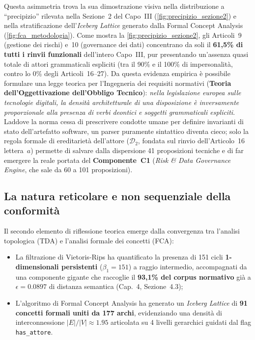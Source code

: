 \documentclass[12pt,a4paper,oneside]{report}
\begin{document}
Questa asimmetria trova la sua dimostrazione visiva nella distribuzione a ``precipizio'' rilevata nella Sezione~2 del Capo~III (\cref{fig:precipizio_sezione2}) e nella stratificazione dell'\emph{Iceberg Lattice} generato dalla Formal Concept Analysis (\cref{fig:fca_metodologia}).
Come mostra la \cref{fig:precipizio_sezione2}, gli Articoli~9 (gestione dei rischi) e~10 (governance dei dati) concentrano da soli il \textbf{61,5\% di tutti i rinvii funzionali} dell'intero Capo~III, pur presentando un'assenza quasi totale di attori grammaticali espliciti (tra il 90\% e il 100\% di impersonalità, contro lo 0\% degli Articoli~16--27). Da questa evidenza empirica è possibile formulare una legge teorica per l'Ingegneria dei requisiti normativi (\textbf{Teoria dell'Oggettivazione dell'Obbligo Tecnico}): \emph{nella legislazione europea sulle tecnologie digitali, la densità architetturale di una disposizione è inversamente proporzionale alla presenza di verbi deontici e soggetti grammaticali espliciti}. Laddove la norma cessa di prescrivere condotte umane per definire invarianti di stato dell'artefatto software, un parser puramente sintattico diventa cieco; solo la regola formale di ereditarietà dell'attore ($\mathcal{D}_2$, fondata sul rinvio dell'Articolo~16 lettera~$a$) permette di salvare dalla dispersione 41 proposizioni tecniche e di far emergere la reale portata del \textbf{Componente~C1} (\emph{Risk \& Data Governance Engine}, che sale da 60 a 101 proposizioni).


\subsection{La natura reticolare e non sequenziale della conformità}

Il secondo elemento di riflessione teorica emerge dalla convergenza tra l'analisi topologica (TDA) e l'analisi formale dei concetti (FCA):
\begin{itemize}
    \item La filtrazione di Vietoris-Rips ha quantificato la presenza di 151 cicli \textbf{1-dimensionali persistenti} ($\beta_1 = 151$) a raggio intermedio, accompagnati da una componente gigante che raccoglie il \textbf{93,1\% del corpus normativo} già a $\epsilon = \num{0,0897}$ di distanza semantica (Cap.~4, Sezione~4.3);
    \item L'algoritmo di Formal Concept Analysis ha generato un \emph{Iceberg Lattice} di \textbf{91 concetti formali uniti da 177 archi}, evidenziando una densità di interconnessione $|E| / |V| \approx \num{1,95}$ articolata su 4 livelli gerarchici guidati dal flag \texttt{has\_attore}.
\end{itemize}
\end{document}
